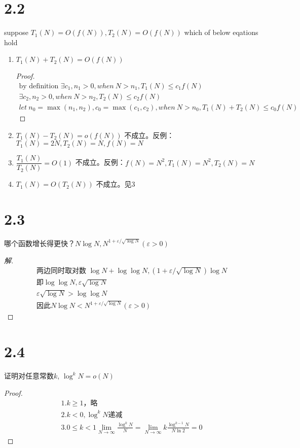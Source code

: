\documentclass[utf8]{ctexart}
\begin{document}
\section*{2.2} 
suppose $T_1 (N) = O(f(N)) ,T_2 (N) = O(f(N))$ which of below eqations hold
\begin{enumerate}
    \item $T_1(N) + T_2(N) = O(f(N))$
        \begin{proof}
            \begin{gather*}
                \text{by definition } \exists c_1, n_1 > 0,when\ N > n_1, T_1(N) \le c_1f(N)
                \\ \exists c_2, n_2 >0, when\ N > n_2, T_2 (N) \le c_2f(N)\\
                let\ n_0 = \max (n_1, n_2), c_0 = \max (c_1, c_2),when\ N > n_0 , T_1(N) + T_2(N) \le c_0 f(N)
            \end{gather*}
        \end{proof}
    \item $T_1(N) - T_2(N) = o(f(N))$
        不成立。反例：$T_1(N ) = 2N, T_2(N) = N, f(N) = N$
    \item $\dfrac{T_1(N)}{T_2(N)} = O(1)$ 
        不成立。反例：$f(N) = N^2 , T_1 (N) = N^2, T_2(N) = N$
    \item $T_1(N) = O(T_2 (N))$
        不成立。见3
\end{enumerate}

\section*{2.3}
哪个函数增长得更快？$N \log N, N^{1+ \varepsilon / \sqrt{\log N}}(\varepsilon > 0)$
\begin{proof}[解]
    \begin{gather*}
        \text{两边同时取对数 } \log N + \log \log N , (1 + \varepsilon /\sqrt {\log N})\log N\\ 
        \text{即}\log\log N , \varepsilon \sqrt{\log N} \\
        \varepsilon \sqrt{\log N } > \log \log N \\
        \text{因此} N \log N< N^{1+ \varepsilon / \sqrt{\log N}}(\varepsilon > 0)
    \end{gather*}
\end{proof}

\section*{2.4}
证明对任意常数$k$, $\log ^ k N = o(N)$
\begin{proof}
\begin{gather*}
    1. k \ge 1，略\\
    2. k <  0, \log ^k N 递减\\
    3. 0 \le k < 1  \lim_{N \to \infty}\frac{\log ^k N}{N} = \lim_{N \to \infty} k \frac{\log ^{k-1} N }{N\ln 2} = 0
\end{gather*}
\end{proof}
\end{document}
